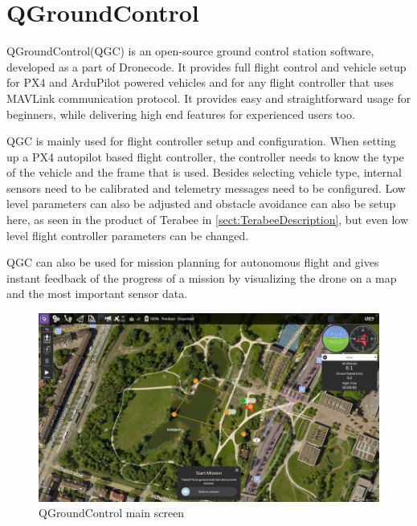 \section{QGroundControl}
QGroundControl(QGC) is an open-source ground control station software, developed as a part of Dronecode. It provides
full flight control and vehicle setup for PX4 and ArduPilot powered vehicles and for any flight controller that
uses MAVLink communication protocol. It provides easy and straightforward usage for beginners, while delivering
high end features for experienced users too.

QGC is mainly used for flight controller setup and configuration. When setting up a PX4 autopilot based flight 
controller, the controller needs to know the type of the vehicle and the frame that is used. Besides selecting 
vehicle type, internal sensors need to be calibrated and telemetry messages need to be configured. Low level 
parameters can also be adjusted and obstacle avoidance can also be setup here, as seen in the product of Terabee
in \ref{sect:TerabeeDescription}, but even low level flight controller parameters can be changed.

QGC can also be used for mission planning for autonomous flight and gives instant feedback of the progress of a 
mission by visualizing the drone on a map and the most important sensor data.

\begin{figure}[h]
    \centering
    \includegraphics[width=130mm, keepaspectratio]{figures/qgc_start_screen.jpg}
    \caption{QGroundControl main screen\cite{QGCWebpage}}
    \label{fig:qgc_main_screen}
\end{figure}